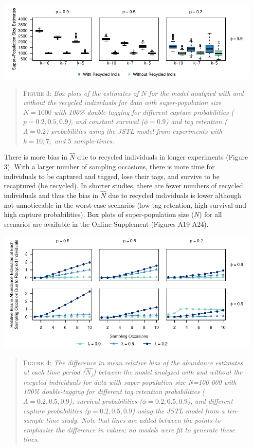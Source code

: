 \documentclass[12pt]{article}
\begin{document}
\includegraphics{RecycledPaper_files/figure-latex/Figure3_N_k-1.pdf}

\begin{quote}
\textsc{Figure 3:}
\textsl{Box plots of the estimates of $N$ for the model analyzed with and without the recycled individuals for data with super-population size $N=1000$ with 100\% double-tagging for different capture probabilities ($p=0.2,0.5,0.9$), and constant survival ($\phi=0.9$) and tag retention ($\Lambda=0.2$) probabilities using the JSTL model from experiments with $k=10, 7,$ and $5$ sample-times. }
\end{quote}

There is more bias in \(\hat{N}\) due to recycled individuals in longer
experiments (Figure 3). With a larger number of sampling occasions,
there is more time for individuals to be captured and tagged, lose their
tags, and survive to be recaptured (be recycled). In shorter studies,
there are fewer numbers of recycled individuals and thus the bias in
\(\hat{N}\) due to recycled individuals is lower although not
unnoticeable in the worst case scenarios (low tag retention, high
survival and high capture probabilities). Box plots of super-population
size (\(N\)) for all scenarios are available in the Online Supplement (Figures
A19-A24).

\includegraphics{RecycledPaper_files/figure-latex/Figure4_N_j-1.pdf}

\begin{quote}
\textsc{Figure 4:}
\textsl{The difference in mean relative bias of the abundance estimates at each time period ($\hat{N_j}$) between the model analyzed with and without the recycled individuals for data with super-population size N=100 000 with 100\% double-tagging for different tag retention probabilities ($\Lambda=0.2,0.5,0.9$), survival probabilities ($\phi=0.2,0.5,0.9$), and different capture probabilities ($p=0.2,0.5,0.9$) using the JSTL model from a ten-sample-time study.  Note that lines are added between the points to emphasize the difference in values; no models were fit to generate these lines.}
\end{quote}
\end{document}
